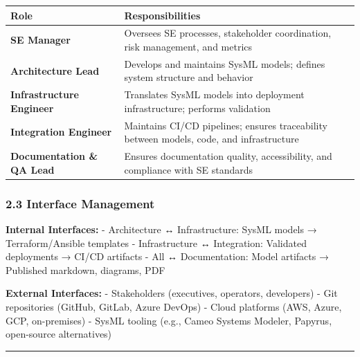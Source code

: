 \documentclass[12pt]{article}
\begin{document}
{\def\LTcaptype{none} %
\begin{longtable}[]{@{}
  >{\raggedright\arraybackslash}p{}
  >{\raggedright\arraybackslash}p{}@{}}
\toprule\noalign{}
\begin{minipage}[b]{\linewidth}\raggedright
Role
\end{minipage} & \begin{minipage}[b]{\linewidth}\raggedright
Responsibilities
\end{minipage} \\
\midrule\noalign{}
\endhead
\bottomrule\noalign{}
\endlastfoot
\textbf{SE Manager} & Oversees SE processes, stakeholder coordination,
risk management, and metrics \\
\textbf{Architecture Lead} & Develops and maintains SysML models;
defines system structure and behavior \\
\textbf{Infrastructure Engineer} & Translates SysML models into
deployment infrastructure; performs validation \\
\textbf{Integration Engineer} & Maintains CI/CD pipelines; ensures
traceability between models, code, and infrastructure \\
\textbf{Documentation \& QA Lead} & Ensures documentation quality,
accessibility, and compliance with SE standards \\
\end{longtable}
}

\subsubsection{2.3 Interface Management}\label{interface-management}

\textbf{Internal Interfaces:} - Architecture ↔ Infrastructure: SysML
models → Terraform/Ansible templates - Infrastructure ↔ Integration:
Validated deployments → CI/CD artifacts - All ↔ Documentation: Model
artifacts → Published markdown, diagrams, PDF

\textbf{External Interfaces:} - Stakeholders (executives, operators,
developers) - Git repositories (GitHub, GitLab, Azure DevOps) - Cloud
platforms (AWS, Azure, GCP, on-premises) - SysML tooling (e.g., Cameo
Systems Modeler, Papyrus, open-source alternatives)

\begin{center}\rule{0.5\linewidth}{0.5pt}\end{center}
\end{document}
